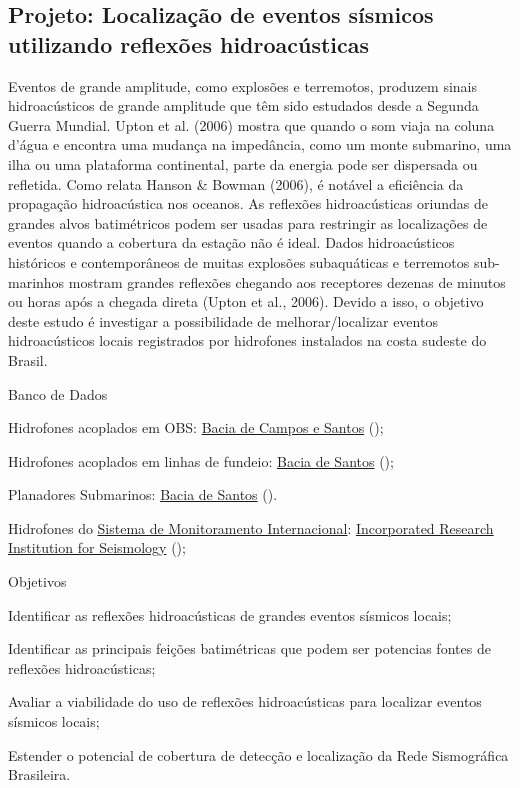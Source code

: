 \documentclass[10pt,a4paper,oneside]{book}
\begin{document}
\subsection{Projeto: Localização de eventos sísmicos utilizando reflexões hidroacústicas}

Eventos de grande amplitude, como explosões e terremotos, produzem sinais hidroacústicos de grande amplitude que têm sido estudados desde a Segunda Guerra Mundial. Upton et al. (2006) mostra que quando o som viaja na coluna d'água e encontra uma mudança na impedância, como um monte submarino, uma ilha ou uma plataforma continental, parte da energia pode ser dispersada ou refletida. Como relata Hanson \& Bowman (2006), é notável a eficiência da propagação hidroacústica nos oceanos. As reflexões hidroacústicas oriundas de grandes alvos batimétricos podem ser usadas para restringir as localizações de eventos quando a cobertura da estação não é ideal. Dados hidroacústicos históricos e contemporâneos de muitas explosões subaquáticas e terremotos sub-marinhos mostram grandes reflexões chegando aos receptores dezenas de minutos ou horas após a chegada direta (Upton et al., 2006). Devido a isso, o objetivo deste estudo é investigar a possibilidade de melhorar/localizar eventos hidroacústicos locais registrados por hidrofones instalados na costa sudeste do Brasil. 

\begin{fancyenum}{\faDatabase}{Banco de Dados}
	\item Hidrofones acoplados em OBS: \href{https://sismo-oceano.ufsc.br/}{Bacia de Campos e Santos} (\faLock);
	\item Hidrofones acoplados em linhas de fundeio: \href{https://comunicabaciadesantos.petrobras.com.br/projeto-de-monitoramento-da-paisagem-acustica-submarina-pmpas-}{Bacia de Santos} (\faLock);
	\item Planadores Submarinos: \href{https://comunicabaciadesantos.petrobras.com.br/projeto-de-monitoramento-da-paisagem-acustica-submarina-pmpas-}{Bacia de Santos} (\faLock).
	\item Hidrofones do \href{https://www.ctbto.org/our-work/international-monitoring-system}{Sistema de Monitoramento Internacional}: \href{https://ds.iris.edu/gmap/\#network=IM\&planet=earth}{Incorporated Research Institution for Seismology} (\faUnlock);
\end{fancyenum}

\begin{fancyenum}{\faFutbol}{Objetivos}
	\item Identificar as reflexões hidroacústicas de grandes eventos sísmicos locais;
	\item Identificar as principais feições batimétricas que podem ser potencias fontes de reflexões hidroacústicas;
	\item Avaliar a viabilidade do uso de reflexões hidroacústicas para localizar eventos sísmicos locais;
	\item Estender o potencial de cobertura de detecção e localização da Rede Sismográfica Brasileira.
\end{fancyenum}
\end{document}
